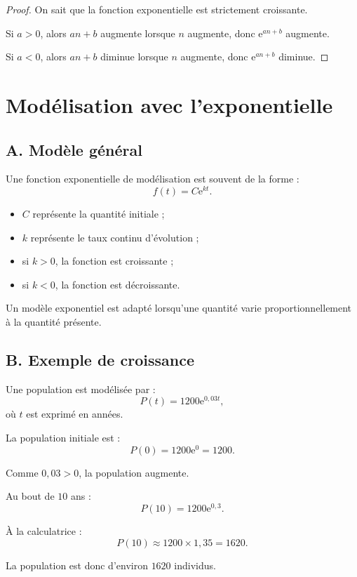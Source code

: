 \documentclass[11pt,a4paper]{article}
\newcommand{\e}{\mathrm{e}}
\begin{document}
\begin{proof}
On sait que la fonction exponentielle est strictement croissante.

Si $a>0$, alors $an+b$ augmente lorsque $n$ augmente, donc $\e^{an+b}$ augmente.

Si $a<0$, alors $an+b$ diminue lorsque $n$ augmente, donc $\e^{an+b}$ diminue.
\end{proof}

\section{Modélisation avec l'exponentielle}

\subsection*{A. Modèle général}

Une fonction exponentielle de modélisation est souvent de la forme :
\[
f(t)=C\e^{kt}.
\]

\begin{itemize}
    \item $C$ représente la quantité initiale ;
    \item $k$ représente le taux continu d'évolution ;
    \item si $k>0$, la fonction est croissante ;
    \item si $k<0$, la fonction est décroissante.
\end{itemize}

\begin{retenir}
Un modèle exponentiel est adapté lorsqu'une quantité varie proportionnellement à la quantité présente.
\end{retenir}

\subsection*{B. Exemple de croissance}

\begin{exemplebox}
Une population est modélisée par :
\[
P(t)=1200\e^{0,03t},
\]
où $t$ est exprimé en années.

La population initiale est :
\[
P(0)=1200\e^0=1200.
\]

Comme $0,03>0$, la population augmente.

Au bout de $10$ ans :
\[
P(10)=1200\e^{0,3}.
\]

À la calculatrice :
\[
P(10)\approx 1200\times 1,35=1620.
\]

La population est donc d'environ $1620$ individus.
\end{exemplebox}
\end{document}
